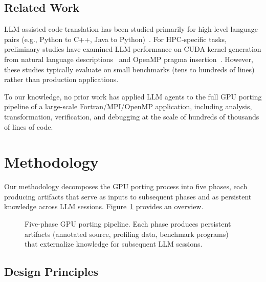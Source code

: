 \documentclass[conference]{IEEEtran}
\begin{document}
\subsection{Related Work}

LLM-assisted code translation has been studied primarily for high-level
language pairs (e.g., Python to C++, Java to Python)~\cite{ref:llm_translation}.
For HPC-specific tasks, preliminary studies have examined LLM performance on
CUDA kernel generation from natural language descriptions~\cite{ref:llm_cuda}
and OpenMP pragma insertion~\cite{ref:llm_openmp}. However, these studies
typically evaluate on small benchmarks (tens to hundreds of lines) rather
than production applications.

To our knowledge, no prior work has applied LLM agents to the full GPU
porting pipeline of a large-scale Fortran/MPI/OpenMP application, including
analysis, transformation, verification, and debugging at the scale of
hundreds of thousands of lines of code.

\section{Methodology}
\label{sec:methodology}

Our methodology decomposes the GPU porting process into five phases, each
producing artifacts that serve as inputs to subsequent phases and as
persistent knowledge across LLM sessions. Figure~\ref{fig:pipeline} provides
an overview.

\begin{figure}[t]
\centering
\caption{Five-phase GPU porting pipeline. Each phase produces persistent
  artifacts (annotated source, profiling data, benchmark programs) that
  externalize knowledge for subsequent LLM sessions.}
\label{fig:pipeline}
\end{figure}

\subsection{Design Principles}
\end{document}
